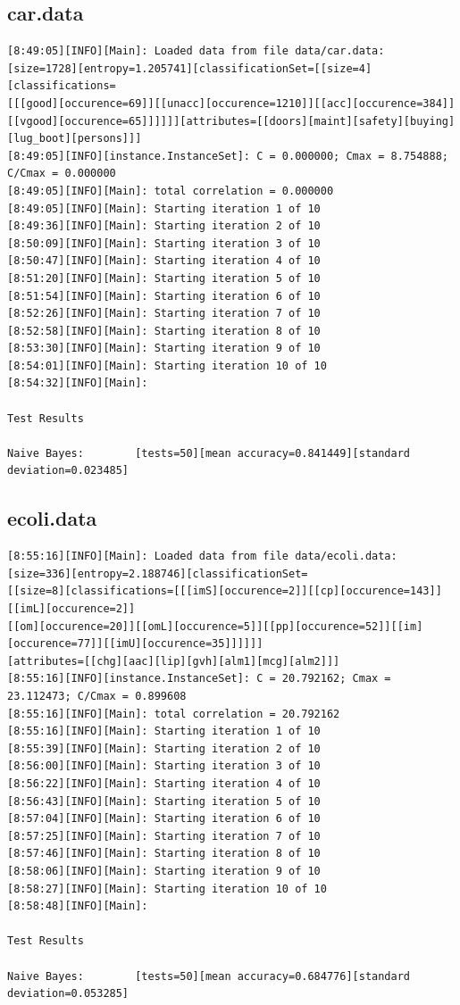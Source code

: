 \documentclass[10pt]{report}
\begin{document}
\subsection*{car.data}
{\small
\begin{verbatim}
[8:49:05][INFO][Main]: Loaded data from file data/car.data:
[size=1728][entropy=1.205741][classificationSet=[[size=4][classifications=
[[[good][occurence=69]][[unacc][occurence=1210]][[acc][occurence=384]]
[[vgood][occurence=65]]]]]][attributes=[[doors][maint][safety][buying][lug_boot][persons]]] 
[8:49:05][INFO][instance.InstanceSet]: C = 0.000000; Cmax = 8.754888; C/Cmax = 0.000000 
[8:49:05][INFO][Main]: total correlation = 0.000000 
[8:49:05][INFO][Main]: Starting iteration 1 of 10 
[8:49:36][INFO][Main]: Starting iteration 2 of 10 
[8:50:09][INFO][Main]: Starting iteration 3 of 10 
[8:50:47][INFO][Main]: Starting iteration 4 of 10 
[8:51:20][INFO][Main]: Starting iteration 5 of 10 
[8:51:54][INFO][Main]: Starting iteration 6 of 10 
[8:52:26][INFO][Main]: Starting iteration 7 of 10 
[8:52:58][INFO][Main]: Starting iteration 8 of 10 
[8:53:30][INFO][Main]: Starting iteration 9 of 10 
[8:54:01][INFO][Main]: Starting iteration 10 of 10 
[8:54:32][INFO][Main]:

Test Results

Naive Bayes:		[tests=50][mean accuracy=0.841449][standard deviation=0.023485] 
\end{verbatim}
}


\subsection*{ecoli.data}
{\small
\begin{verbatim}
[8:55:16][INFO][Main]: Loaded data from file data/ecoli.data:
[size=336][entropy=2.188746][classificationSet=
[[size=8][classifications=[[[imS][occurence=2]][[cp][occurence=143]][[imL][occurence=2]]
[[om][occurence=20]][[omL][occurence=5]][[pp][occurence=52]][[im][occurence=77]][[imU][occurence=35]]]]]]
[attributes=[[chg][aac][lip][gvh][alm1][mcg][alm2]]] 
[8:55:16][INFO][instance.InstanceSet]: C = 20.792162; Cmax = 23.112473; C/Cmax = 0.899608 
[8:55:16][INFO][Main]: total correlation = 20.792162 
[8:55:16][INFO][Main]: Starting iteration 1 of 10 
[8:55:39][INFO][Main]: Starting iteration 2 of 10 
[8:56:00][INFO][Main]: Starting iteration 3 of 10 
[8:56:22][INFO][Main]: Starting iteration 4 of 10 
[8:56:43][INFO][Main]: Starting iteration 5 of 10 
[8:57:04][INFO][Main]: Starting iteration 6 of 10 
[8:57:25][INFO][Main]: Starting iteration 7 of 10 
[8:57:46][INFO][Main]: Starting iteration 8 of 10 
[8:58:06][INFO][Main]: Starting iteration 9 of 10 
[8:58:27][INFO][Main]: Starting iteration 10 of 10 
[8:58:48][INFO][Main]: 

Test Results

Naive Bayes:		[tests=50][mean accuracy=0.684776][standard deviation=0.053285] 
\end{verbatim}
}
\end{document}

